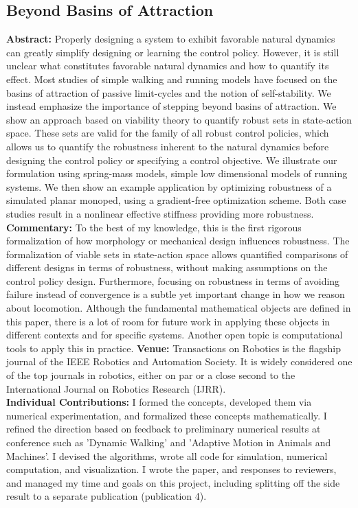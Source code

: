 \subsection{Beyond Basins of Attraction}
\textbf{Abstract: }
Properly designing a system to exhibit favorable natural dynamics can greatly simplify designing or learning the control policy. However, it is still unclear what constitutes favorable natural dynamics and how to quantify its effect. Most studies of simple walking and running models have focused on the basins of attraction of passive limit-cycles and the notion of self-stability. We instead emphasize the importance of stepping beyond basins of attraction. We show an approach based on viability theory to quantify robust sets in state-action space. These sets are valid for the family of all robust control policies, which allows us to quantify the robustness inherent to the natural dynamics before designing the control policy or specifying a control objective.
We illustrate our formulation using spring-mass models, simple low dimensional models of running systems. We then show an example application by optimizing robustness of a simulated planar monoped, using a gradient-free optimization scheme. Both case studies result in a nonlinear effective stiffness providing more robustness. \\
\textbf{Commentary: }
To the best of my knowledge, this is the first rigorous formalization of how morphology or mechanical design influences robustness. The formalization of viable sets in state-action space allows quantified comparisons of different designs in terms of robustness, without making assumptions on the control policy design. Furthermore, focusing on robustness in terms of avoiding failure instead of convergence is a subtle yet important change in how we reason about locomotion. Although the fundamental mathematical objects are defined in this paper, there is a lot of room for future work in applying these objects in different contexts and for specific systems. Another open topic is computational tools to apply this in practice.
\textbf{Venue: }
Transactions on Robotics is the flagship journal of the IEEE Robotics and Automation Society. It is widely considered one of the top journals in robotics, either on par or a close second to the International Journal on Robotics Research (IJRR). \\
\textbf{Individual Contributions: }
I formed the concepts, developed them via numerical experimentation, and formalized these concepts mathematically. I refined the direction based on feedback to preliminary numerical results at conference such as 'Dynamic Walking' and 'Adaptive Motion in Animals and Machines'. I devised the algorithms, wrote all code for simulation, numerical computation, and visualization. I wrote the paper, and responses to reviewers, and managed my time and goals on this project, including splitting off the side result to a separate publication (publication 4).
